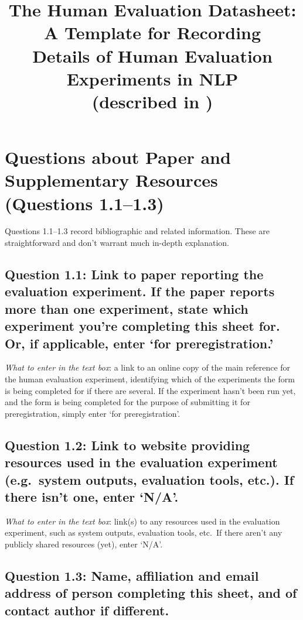 \documentclass[11pt,a4paper]{article}
\title{The Human Evaluation Datasheet: A Template for Recording\\Details of Human Evaluation Experiments in NLP\\
\normalsize{(described in \citet{shimorina-belz-2022-human})}}
\begin{document}
\maketitle


\section{Questions about Paper and Supplementary Resources (Questions 1.1--1.3)}\label{sec:paper-resources}

Questions 1.1--1.3 record bibliographic and related information. These are straightforward and don't warrant much in-depth explanation.

\vspace{-.3cm}
\subsection*{Question 1.1: Link to paper reporting the evaluation experiment. If the paper reports more than one experiment, state which experiment you're completing this sheet for. Or, if applicable, enter `for preregistration.'}

\noindent\textit{What to enter in the text box}: a link to an online copy of the main reference for the human evaluation experiment, identifying which of the experiments the form is being completed for if there are several. If the experiment hasn't been run yet, and the form is being completed for the purpose of submitting it for preregistration, simply enter `for preregistration'.

\vspace{-.3cm}
\subsection*{Question 1.2: Link to website providing resources used in the evaluation experiment (e.g.\ system outputs, evaluation tools, etc.). If there isn't one, enter `N/A'.}

\noindent\textit{What to enter in the text box}: link(s) to any resources used in the evaluation experiment, such as system outputs, evaluation tools, etc.\ If there aren't any publicly shared resources (yet), enter `N/A’.

\vspace{-.3cm}
\subsection*{Question 1.3: Name, affiliation and email address of person completing this sheet, and of contact author if different.}
\end{document}
